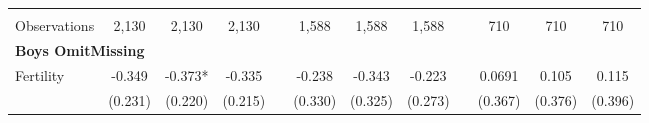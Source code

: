\begin{landscape}
\begin{table}[htpb!]
\begin{center}
\begin{tabular}{lcccp{2mm}cccp{2mm}ccc}
\begin{footnotesize}\end{footnotesize}&\begin{footnotesize}\end{footnotesize}&\begin{footnotesize}\end{footnotesize}&\begin{footnotesize}\end{footnotesize}&\begin{footnotesize}\end{footnotesize}&\begin{footnotesize}\end{footnotesize}&\begin{footnotesize}\end{footnotesize}&\begin{footnotesize}\end{footnotesize}&\begin{footnotesize}\end{footnotesize}&\begin{footnotesize}\end{footnotesize}&\begin{footnotesize}\end{footnotesize}&\begin{footnotesize}\end{footnotesize}\\Observations&2,130&2,130&2,130&&1,588&1,588&1,588&&710&710&710\\
\multicolumn{12}{l}{\textbf{Boys OmitMissing}}\\ 
Fertility&-0.349&-0.373*&-0.335&&-0.238&-0.343&-0.223&&0.0691&0.105&0.115\\
&(0.231)&(0.220)&(0.215)&&(0.330)&(0.325)&(0.273)&&(0.367)&(0.376)&(0.396)\\

\end{tabular}
\end{center}
\end{table}
\end{landscape}
